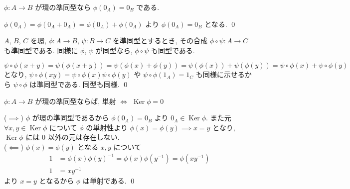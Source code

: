\documentclass[uplatex,dvipdfmx,a4paper,11pt]{jlreq}
\makeatletter
\DeclareMathOperator{\Kernel}{Ker}
\theoremstyle{definition}
\renewenvironment{proof}[1][\proofname]{\par
  \normalfont
  \topsep6\p@\@plus6\p@ \trivlist
  \item[\hskip\labelsep{\bfseries #1}\@addpunct{\bfseries}]\ignorespaces\quad\par
}{%
  \qed\endtrivlist\@endpefalse
}
\renewcommand\proofname{証明}
\makeatother
\begin{document}
\begin{proposition}
  $\phi:A\to B$ が環の準同型なら $\phi(0_A) = 0_B$ である.
\end{proposition}
\begin{proof}
  $\phi(0_A) = \phi(0_A + 0_A) = \phi(0_A) + \phi(0_A)$ より $\phi(0_A) = 0_B$ となる.
\end{proof}

\begin{proposition}
  $A$, $B$, $C$ を環, $\phi:A\to B$, $\psi:B\to C$ を準同型とするとき, その合成 $\phi\circ\psi:A\to C$ も準同型である. 同様に $\phi$, $\psi$ が同型なら, $\phi\circ\psi$ も同型である.
\end{proposition}
\begin{proof}
  $\psi\circ\phi(x + y) = \psi(\phi(x + y)) = \psi(\phi(x) + \phi(y)) = \psi(\phi(x)) + \psi(\phi(y)) = \psi\circ\phi(x) + \psi\circ\phi(y)$ となり, $\psi\circ\phi(xy) = \psi\circ\phi(x)\psi\circ\phi(y)$ や $\psi\circ\phi(1_A) = 1_C$ も同様に示せるから $\psi\circ\phi$ は準同型である. 同型も同様.
\end{proof}

\begin{proposition}
  $\phi:A\to B$ が環の準同型ならば, 単射 $\iff$ $\Kernel{\phi} = \qty{0}$
\end{proposition}
\begin{proof}
  ($\implies$) $\phi$ が環の準同型であるから $\phi(0_A) = 0_B$ より $0_A\in\Kernel\phi$. また元 $\forall x, y \in \Kernel\phi$ について $\phi$ の単射性より $\phi(x) = \phi(y) \implies x = y$ となり, $\Kernel\phi$ には $0$ 以外の元は存在しない. \\
  ($\impliedby$) $\phi(x) = \phi(y)$ となる $x, y$ について
  \begin{align}
    1 & = \phi(x)\phi(y)^{-1} = \phi(x)\phi(y^{-1}) = \phi(xy^{-1}) \\
    1 & = xy^{-1}
  \end{align}
  より $x = y$ となるから $\phi$ は単射である.
\end{proof}
\end{document}
